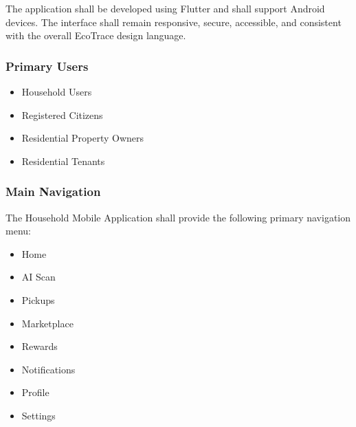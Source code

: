 The application shall be developed using Flutter and shall support
Android devices. The interface shall remain responsive, secure,
accessible, and consistent with the overall EcoTrace design language.


\subsubsection*{Primary Users}

\begin{itemize}

\item Household Users

\item Registered Citizens

\item Residential Property Owners

\item Residential Tenants

\end{itemize}


\subsubsection*{Main Navigation}

The Household Mobile Application shall provide the following primary
navigation menu:

\begin{itemize}

\item Home

\item AI Scan

\item Pickups

\item Marketplace

\item Rewards

\item Notifications

\item Profile

\item Settings

\end{itemize}

